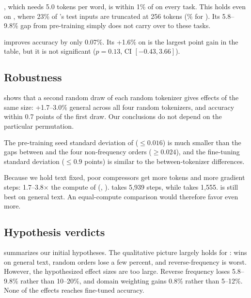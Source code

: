 \revlearn, which needs 5.0 tokens per word, is within 1\% of \freq on every task.
This holds even on \agnews, where 23\% of \revlearn's test inputs are truncated at 256 tokens (\% for \freq).
Its 5.8--9.8\% \bpb gap from pre-training simply does not carry over to these tasks.

\domain improves \pubmedrct accuracy by only 0.07\%.
Its +1.6\% on \sst is the largest point gain in the table, but it is not significant ($p=0.13$, CI $[-0.43, 3.66]$).

\subsection{Robustness}
\label{sec:robustness}



 shows that a second random draw of each random tokenizer gives effects of the same size: +1.7--3.0\% general \bpb across all four random tokenizers, and accuracy within 0.7 points of the first draw.
Our conclusions do not depend on the particular permutation.

The pre-training seed standard deviation of \bpb ($\le 0.016$) is much smaller than the gaps between \freq and the four non-frequency orders ($\ge 0.024$), and the fine-tuning standard deviation ($\le 0.9$ points) is similar to the between-tokenizer differences.

Because we hold text fixed, poor compressors get more tokens and more gradient steps: 1.7--3.8$\times$ the compute of \freq (, ).
\revlearn takes 5,939 steps, while \freq takes 1,555.
\freq is still best on general text.
An equal-compute comparison would therefore favor \freq even more.

\subsection{Hypothesis verdicts}
\label{sec:verdicts}



 summarizes our initial hypotheses.
The qualitative picture largely holds for \bpb: \freq wins on general text, random orders lose a few percent, and reverse-frequency is worst.
However, the hypothesized effect sizes are too large.
Reverse frequency loses 5.8--9.8\% rather than 10--20\%, and domain weighting gains 0.8\% rather than 5--12\%.
None of the effects reaches fine-tuned accuracy.
